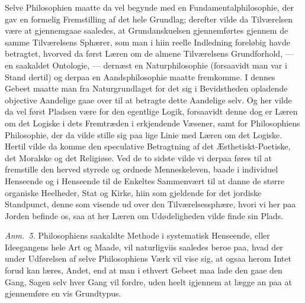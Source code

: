 \documentclass[12pt,a4paper]{book}
\begin{document}
{\small Selve Philosophien maatte da vel begynde med en Fundamentalphilosophie, der
gav en formelig Fremstilling af det hele Grundlag; derefter vilde da Tilværelsen være
at gjennemgaae saaledes, at Grundanskuelsen gjennemførtes gjennem de samme
Tilværelsens Sphærer, som man i hiin reelle Indledning foreløbig havde betragtet,
hvorved da først Læren om de almene Tilværelsens Grundforhold, --- en saakaldet
Ontologie, --- dernæst en Naturphilosophie (forsaavidt man var i Stand dertil) og
derpaa en Aandsphilosophie maatte fremkomme. I dennes Gebeet maatte man fra
Naturgrundlaget for det sig i Bevidstheden opladende objective Aandelige gaae over
til at betragte dette Aandelige selv. Og her vilde da vel først Pladsen være for den
egentlige Logik, forsaavidt denne dog er Læren om det Logiske i dets Fremtræden i
erkjendende Væsener, samt for Philosophiens Philosophie, der da vilde stille sig paa
lige Linie med Læren om det Logiske. Hertil vilde da komme den speculative
Betragtning af det Æsthetiskt-Poetiske, det Moralske og det Religiøse. Ved de to
sidste vilde vi derpaa føres til at fremstille den herved styrede og ordnede
Menneskeleven, baade i individuel Henseende og i Henseende til de Enkeltes Sammenvært
til at danne de større organiske Heelheder, Stat og Kirke, hiin som gjeldende for det
jordiske Standpunct, denne som visende ud over den Tilværelsessphære, hvori vi her
paa Jorden befinde os, saa at her Læren om Udødeligheden vilde finde sin Plads.\par}

{\small\emph{Anm.~5.} Philosophiens saakaldte Methode i systematisk Henseende, eller
Ideegangens hele Art og Maade, vil naturligviis saaledes beroe paa, hvad der under
Udførelsen af selve Philosophiens Værk vil vise sig, at ogsaa herom Intet forud kan
læres, Andet, end at man i ethvert Gebeet maa lade den gaae den Gang, Sagen selv hver
Gang vil fordre, uden heelt igjennem at lægge an paa at gjennemføre en vis
Grundtypus.\par}
\end{document}
